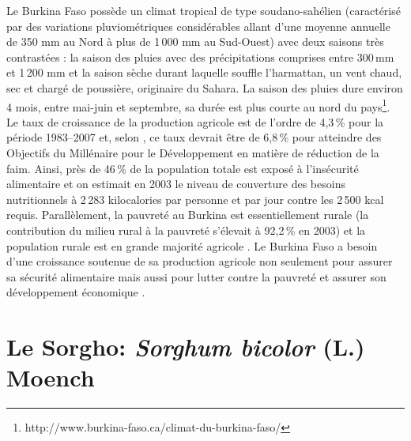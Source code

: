 \documentclass[a4paper,11pt]{article}
\begin{document}
Le Burkina Faso possède un climat tropical de type soudano-sahélien
(caractérisé par des variations pluviométriques considérables allant
d'une moyenne annuelle de 350 mm au Nord à plus de 1\,000 mm au
Sud-Ouest) avec deux saisons très contrastées : la saison des pluies
avec des précipitations comprises entre 300\,mm et 1\,200 mm et la
saison sèche durant laquelle souffle l'harmattan, un vent chaud, sec
et chargé de poussière, originaire du Sahara. La saison des pluies
dure environ 4 mois, entre mai-juin et septembre, sa durée est plus
courte au nord du
pays\footnote{http://www.burkina-faso.ca/climat-du-burkina-faso/}. Le
taux de croissance de la production agricole est de l'ordre de 4,3\,\%
pour la période 1983--2007 et, selon , ce taux
devrait être de 6,8\,\% pour atteindre des Objectifs du Millénaire
pour le Développement en matière de réduction de la faim. Ainsi, près
de 46\,\% de la population totale est exposé à l'insécurité
alimentaire et on estimait en 2003 le niveau de couverture des besoins
nutritionnels à 2\,283 kilocalories par personne et par jour contre les
2\,500 kcal requis. Parallèlement, la pauvreté au Burkina est
essentiellement rurale (la contribution du milieu rural à la pauvreté
s'élevait à 92,2\,\% en 2003) et la population rurale est en grande
majorité agricole \cite{DPSAA_2011}. Le Burkina Faso a besoin d'une
croissance soutenue de sa production agricole non seulement pour
assurer sa sécurité alimentaire mais aussi pour lutter contre la
pauvreté et assurer son développement économique
\cite{Koulibi_FideleZONGO}.

\section{Le Sorgho: \emph{Sorghum bicolor} (L.) Moench}



\end{document}
